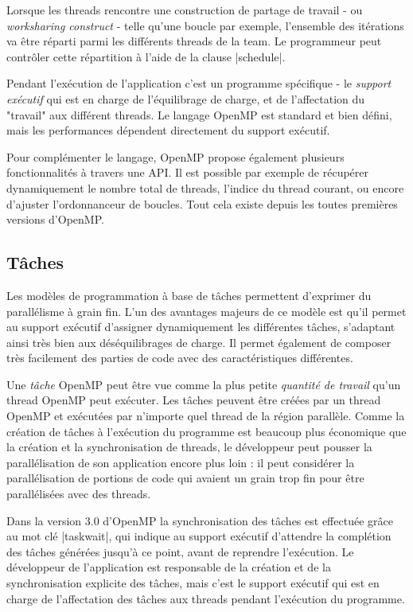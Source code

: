 Lorsque les threads rencontre une construction de partage de travail - ou \emph{worksharing construct} - telle qu'une boucle par exemple, l'ensemble des itérations va être réparti parmi les différents threads de la team.
Le programmeur peut contrôler cette répartition à l'aide de la clause |schedule|.

Pendant l'exécution de l'application c'est un programme spécifique - le \emph{support exécutif} qui est en charge de l'équilibrage de charge, et de l'affectation du "travail" aux différent threads.
Le langage OpenMP est standard et bien défini, mais les performances dépendent directement du support exécutif.

Pour complémenter le langage, OpenMP propose également plusieurs fonctionnalités à travers une API. Il est possible par exemple de récupérer dynamiquement le nombre total de threads, l'indice du thread courant, ou encore d'ajuster l'ordonnanceur de boucles.
Tout cela existe depuis les toutes premières versions d'OpenMP.


\subsection{Tâches}

Les modèles de programmation à base de tâches permettent d'exprimer du parallélisme à grain fin. L'un des avantages majeurs de ce modèle est qu'il permet au support exécutif d'assigner dynamiquement les différentes tâches, s'adaptant ainsi très bien aux déséquilibrages de charge. Il permet également de composer très facilement des parties de code avec des caractéristiques différentes.

Une \emph{tâche} OpenMP peut être vue comme la plus petite \emph{quantité de travail} qu'un thread OpenMP peut exécuter.
Les tâches peuvent être créées par un thread OpenMP et exécutées par n'importe quel thread de la région parallèle.
Comme la création de tâches à l'exécution du programme est beaucoup plus économique que la création et la synchronisation de threads, le développeur peut pousser la parallélisation de son application encore plus loin : il peut considérer la parallélisation de portions de code qui avaient un grain trop fin pour être parallélisées avec des threads.

Dans la version 3.0 d'OpenMP la synchronisation des tâches est effectuée grâce au mot clé |taskwait|, qui indique au support exécutif d'attendre la complétion des tâches générées jusqu'à ce point, avant de reprendre l'exécution.
Le développeur de l'application est responsable de la création et de la synchronisation explicite des tâches, mais c'est le support exécutif qui est en charge de l'affectation des tâches aux threads pendant l'exécution du programme.

